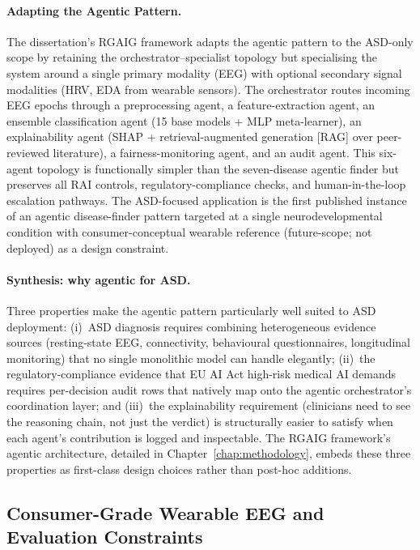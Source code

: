 \paragraph{Adapting the Agentic Pattern.}
The dissertation's RGAIG framework adapts the agentic pattern to the ASD-only scope by retaining the orchestrator--specialist topology but specialising the system around a single primary modality (EEG) with optional secondary signal modalities (HRV, EDA from wearable sensors). The orchestrator routes incoming EEG epochs through a preprocessing agent, a feature-extraction agent, an ensemble classification agent (15 base models + MLP meta-learner), an explainability agent (SHAP + retrieval-augmented generation [RAG] over peer-reviewed literature), a fairness-monitoring agent, and an audit agent. This six-agent topology is functionally simpler than the seven-disease agentic finder but preserves all RAI controls, regulatory-compliance checks, and human-in-the-loop escalation pathways. The ASD-focused application is the first published instance of an agentic disease-finder pattern targeted at a single neurodevelopmental condition with consumer-conceptual wearable reference (future-scope; not deployed) as a design constraint.

\paragraph{Synthesis: why agentic for ASD.}
Three properties make the agentic pattern particularly well suited to ASD deployment: (i)~ASD diagnosis requires combining heterogeneous evidence sources (resting-state EEG, connectivity, behavioural questionnaires, longitudinal monitoring) that no single monolithic model can handle elegantly; (ii)~the regulatory-compliance evidence that EU AI Act high-risk medical AI demands requires per-decision audit rows that natively map onto the agentic orchestrator's coordination layer; and (iii)~the explainability requirement (clinicians need to see the reasoning chain, not just the verdict) is structurally easier to satisfy when each agent's contribution is logged and inspectable. The RGAIG framework's agentic architecture, detailed in Chapter~\ref{chap:methodology}, embeds these three properties as first-class design choices rather than post-hoc additions.

\subsection{Consumer-Grade Wearable EEG and Evaluation Constraints}
\label{subsec:wearable_eeg}

